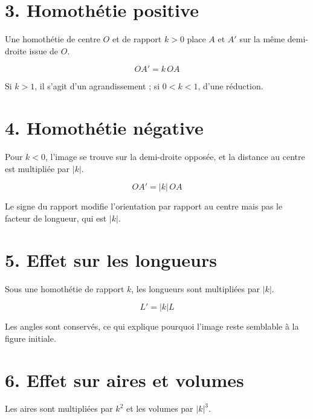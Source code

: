 
\section{3. Homothétie positive}
Une homothétie de centre $O$ et de rapport $k>0$ place $A$ et $A'$ sur la même demi-droite issue de $O$.

\[
OA'=k\,OA
\]

\begin{exemple}
Si $k>1$, il s’agit d’un agrandissement ; si $0<k<1$, d’une réduction.
\end{exemple}

\section{4. Homothétie négative}
Pour $k<0$, l’image se trouve sur la demi-droite opposée, et la distance au centre est multipliée par $|k|$.

\[
OA'=|k|\,OA
\]

\begin{exemple}
Le signe du rapport modifie l’orientation par rapport au centre mais pas le facteur de longueur, qui est $|k|$.
\end{exemple}

\section{5. Effet sur les longueurs}
Sous une homothétie de rapport $k$, les longueurs sont multipliées par $|k|$.

\[
L'=|k|L
\]

\begin{exemple}
Les angles sont conservés, ce qui explique pourquoi l’image reste semblable à la figure initiale.
\end{exemple}


\section{6. Effet sur aires et volumes}
Les aires sont multipliées par $k^2$ et les volumes par $|k|^3$.

